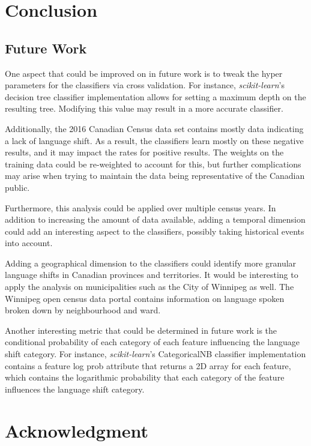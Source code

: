 \documentclass[10pt, conference, compsocconf]{IEEEtran}
\begin{document}
\section{Conclusion}


\subsection{Future Work}
One aspect that could be improved on in future work is to tweak the hyper parameters for the classifiers via cross validation. For instance, \textit{scikit-learn}'s decision tree classifier implementation allows for setting a maximum depth on the resulting tree. Modifying this value may result in a more accurate classifier.

Additionally, the 2016 Canadian Census data set contains mostly data indicating a lack of language shift. As a result, the classifiers learn mostly on these negative results, and it may impact the rates for positive results. The weights on the training data could be re-weighted to account for this, but further complications may arise when trying to maintain the data being representative of the Canadian public.

Furthermore, this analysis could be applied over multiple census years. In addition to increasing the amount of data available, adding a temporal dimension could add an interesting aspect to the classifiers, possibly taking historical events into account.

Adding a geographical dimension to the classifiers could identify more granular language shifts in Canadian provinces and territories. It would be interesting to apply the analysis on municipalities such as the City of Winnipeg as well. The Winnipeg open census data portal contains information on language spoken broken down by neighbourhood and ward.

Another interesting metric that could be determined in future work is the conditional probability of each category of each feature influencing the language shift category. For instance, \textit{scikit-learn}'s CategoricalNB classifier implementation contains a feature log prob attribute that returns a 2D array for each feature, which contains the logarithmic probability that each category of the feature influences the language shift category.

\section*{Acknowledgment}
\end{document}
